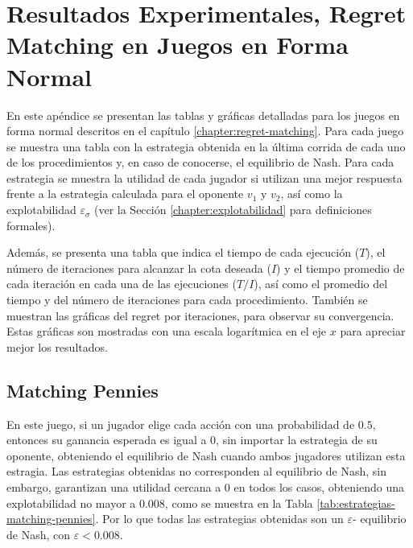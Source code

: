 \chapter{Resultados Experimentales, Regret Matching en Juegos en Forma Normal}
\label{apex:chapter:experimentos-rm}

En este apéndice se presentan las tablas y gráficas detalladas para los juegos en forma normal descritos en el capítulo \ref{chapter:regret-matching}. Para cada juego se muestra una tabla con la estrategia obtenida en la última corrida de cada uno de los procedimientos y, en caso de conocerse, el equilibrio de Nash. Para cada estrategia se muestra la utilidad de cada jugador si utilizan una mejor respuesta frente a la estrategia calculada para el oponente $v_1$ y $v_2$, así como la explotabilidad $\varepsilon_{\sigma}$ (ver la Sección \ref{chapter:explotabilidad} para definiciones formales).

Además, se presenta una tabla que indica el tiempo de cada ejecución ($T$), el número de iteraciones para alcanzar la cota deseada ($I$) y el tiempo promedio de cada iteración en cada una de las ejecuciones ($T/I$), así como el promedio del tiempo y del número de iteraciones para cada procedimiento. También se muestran las gráficas del regret por iteraciones, para observar su convergencia. Estas gráficas son mostradas con una escala logarítmica en el eje $x$ para apreciar mejor los resultados.

\newcommand{\graphicsRM}[2]{
\begin{figure}
    \caption{Gráficas del regret con respecto al número de iteraciones del juego #1}
    \label{fig:regret-#2}
    \centering
    \texttt{[image: graficas/\#2/procedimiento-A.png]}
    \texttt{[image: graficas/\#2/procedimiento-B.png]}
    \texttt{[image: graficas/\#2/procedimiento-C.png]}
\end{figure}
}

\section{Matching Pennies}

En este juego, si un jugador elige cada acción con una probabilidad de $0.5$, entonces su ganancia esperada es igual a $0$, sin importar la estrategia de su oponente, obteniendo el equilibrio de Nash cuando ambos jugadores utilizan esta estragia. Las estrategias obtenidas no corresponden al equilibrio de Nash, sin embargo, garantizan una utilidad cercana a $0$ en todos los casos, obteniendo una explotabilidad no mayor a $0.008$, como se muestra en la Tabla \ref{tab:estrategias-matching-pennies}. Por lo que todas las estrategias obtenidas son un $\varepsilon$- equilibrio de Nash, con $\varepsilon < 0.008$.

